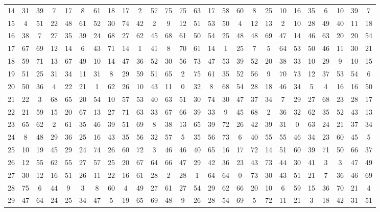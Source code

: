 \begin{table}
\begin{tabular}{c c c c c c c c c c c c c c c c c c c c c c c c c c }
14 & 31 & 39 & 7 & 17 & 8 & 61 & 18 & 17 & 2 & 57 & 75 & 75 & 63 & 17 & 58 & 60 & 8 & 25 & 10 & 16 & 35 & 6 & 10 & 39 & 7 \\
15 & 4 & 51 & 22 & 48 & 61 & 52 & 30 & 74 & 42 & 2 & 9 & 12 & 51 & 53 & 50 & 4 & 12 & 13 & 2 & 10 & 28 & 49 & 40 & 11 & 18 \\
16 & 38 & 7 & 27 & 35 & 39 & 24 & 68 & 27 & 62 & 45 & 68 & 61 & 50 & 54 & 25 & 48 & 48 & 69 & 47 & 14 & 46 & 63 & 20 & 20 & 54 \\
17 & 67 & 69 & 12 & 14 & 6 & 43 & 71 & 14 & 1 & 41 & 8 & 70 & 61 & 14 & 1 & 25 & 7 & 5 & 64 & 53 & 50 & 46 & 11 & 30 & 21 \\
18 & 59 & 71 & 13 & 67 & 49 & 10 & 14 & 47 & 36 & 52 & 30 & 56 & 73 & 47 & 53 & 39 & 52 & 20 & 38 & 33 & 10 & 29 & 9 & 10 & 15 \\
19 & 51 & 25 & 31 & 34 & 11 & 31 & 8 & 29 & 59 & 51 & 65 & 2 & 75 & 61 & 35 & 52 & 56 & 9 & 70 & 73 & 12 & 37 & 53 & 54 & 6 \\
20 & 50 & 36 & 4 & 22 & 21 & 1 & 62 & 26 & 10 & 43 & 11 & 0 & 32 & 8 & 68 & 54 & 28 & 18 & 46 & 34 & 5 & 4 & 16 & 16 & 50 \\
21 & 22 & 3 & 68 & 65 & 20 & 54 & 10 & 57 & 53 & 40 & 63 & 51 & 30 & 74 & 30 & 47 & 37 & 34 & 7 & 29 & 27 & 68 & 23 & 28 & 17 \\
22 & 21 & 59 & 15 & 20 & 67 & 13 & 27 & 71 & 63 & 33 & 67 & 66 & 39 & 33 & 9 & 45 & 68 & 2 & 36 & 32 & 62 & 35 & 52 & 43 & 13 \\
23 & 65 & 62 & 2 & 61 & 35 & 46 & 39 & 51 & 69 & 8 & 38 & 13 & 65 & 39 & 72 & 26 & 42 & 39 & 31 & 0 & 63 & 24 & 21 & 37 & 34 \\
24 & 8 & 48 & 29 & 36 & 25 & 16 & 43 & 35 & 56 & 32 & 57 & 5 & 35 & 56 & 73 & 6 & 40 & 55 & 55 & 46 & 34 & 23 & 60 & 45 & 5 \\
25 & 10 & 19 & 45 & 29 & 24 & 74 & 26 & 60 & 72 & 3 & 46 & 46 & 40 & 65 & 16 & 17 & 72 & 14 & 51 & 60 & 39 & 71 & 50 & 66 & 37 \\
26 & 12 & 55 & 62 & 55 & 27 & 57 & 25 & 20 & 67 & 64 & 66 & 47 & 29 & 42 & 36 & 23 & 43 & 73 & 44 & 30 & 41 & 3 & 3 & 47 & 49 \\
27 & 30 & 12 & 16 & 51 & 26 & 11 & 22 & 16 & 61 & 28 & 2 & 28 & 1 & 64 & 64 & 0 & 73 & 30 & 43 & 51 & 21 & 7 & 36 & 46 & 69 \\
28 & 75 & 6 & 44 & 9 & 3 & 8 & 60 & 4 & 49 & 27 & 61 & 27 & 54 & 29 & 62 & 66 & 20 & 10 & 6 & 59 & 15 & 36 & 70 & 21 & 4 \\
29 & 47 & 64 & 24 & 25 & 34 & 47 & 5 & 19 & 65 & 69 & 48 & 9 & 26 & 28 & 54 & 69 & 5 & 72 & 11 & 21 & 3 & 18 & 42 & 31 & 51 \\

\end{tabular}
\end{table}
